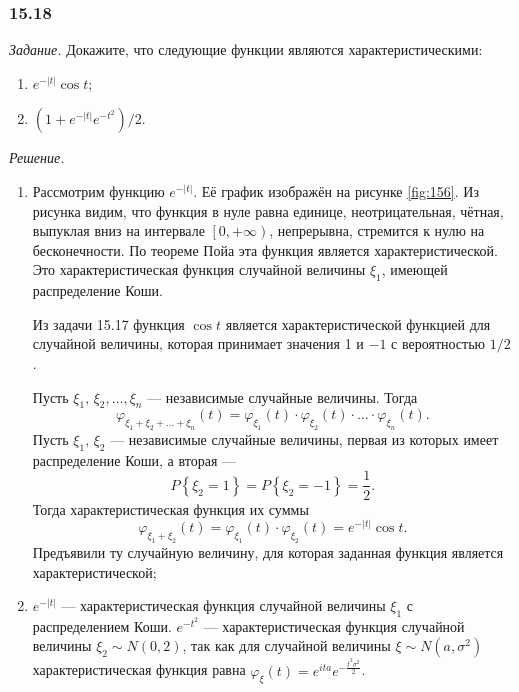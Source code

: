 \subsubsection*{15.18}

\textit{Задание.} Докажите, что следующие функции являются характеристическими:
\begin{enumerate}[label=\alph*)]
\item $e^{- \left| t \right| } \cos t$;
\item $ \left( 1 + e^{- \left| t \right| }e^{- t^2} \right) / 2$.
\end{enumerate}

\textit{Решение.}
\begin{enumerate}[label=\alph*)]
\item Рассмотрим функцию $e^{- \left| t \right| }$.
Её график изображён на рисунке \ref{fig:156}.
Из рисунка видим, что функция в нуле равна единице, неотрицательная, чётная, выпуклая вниз на интервале $ \left[ 0, + \infty \right) $, непрерывна,
стремится к нулю на бесконечности.
По теореме Пойа эта функция является характеристической.
Это характеристическая функция случайной величины $ \xi_1$, имеющей распределение Коши.

Из задачи 15.17 функция $ \cos t$ является характеристической функцией для случайной величины, которая принимает значения 1 и $- 1$ с вероятностью $1 / 2$.

Пусть $ \xi_1, \, \xi_2, \dotsc, \xi_n$ --- независимые случайные величины.
Тогда
$$ \varphi_{ \xi_1 + \xi_2 + \dotsc + \xi_n} \left( t \right) =
\varphi_{ \xi_1} \left( t \right) \cdot \varphi_{ \xi_2} \left( t \right) \cdot \dotsc \cdot \varphi_{ \xi_n} \left( t \right).$$
Пусть $ \xi_1, \, \xi_2$ --- независимые случайные величины, первая из которых имеет распределение Коши, а вторая ---
$$P \left\{ \xi_2 = 1 \right\} =
P \left\{ \xi_2 = - 1 \right\} =
\frac{1}{2}.$$
Тогда характеристическая функция их суммы
$$ \varphi_{ \xi_1 + \xi_2} \left( t \right) =
\varphi_{ \xi_1} \left( t \right) \cdot \varphi_{ \xi_2} \left( t \right) =
e^{- \left| t \right| } \cos t.$$
Предъявили ту случайную величину, для которая заданная функция является характеристической;
\item $e^{- \left| t \right| }$ --- характеристическая функция случайной величины $ \xi_1$ с распределением Коши.
$e^{- t^2}$ --- характеристическая функция случайной величины $ \xi_2 \sim N \left( 0, 2 \right) $,
так как для случайной величины $ \xi \sim N \left( a, \sigma^2 \right) $ характеристическая функция равна
$ \varphi_{ \xi } \left( t \right) =
e^{ita}e^{- \frac{t^2 \sigma^2}{2}}$.


\end{enumerate}
